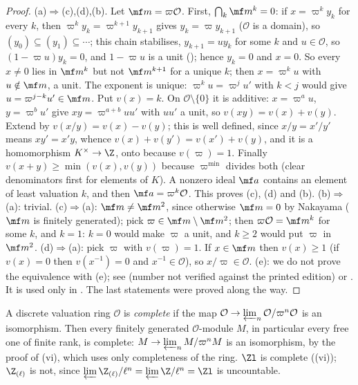 \begin{proof}
(a)$\Rightarrow$(c),(d),(b). Let $\mf m=\varpi\mathcal O$. First, $\bigcap_k\mf m^k=0$: if $x=\varpi^ky_k$ for every $k$, then $\varpi^ky_k=\varpi^{k+1}y_{k+1}$ gives
$y_k=\varpi y_{k+1}$ ($\mathcal O$ is a domain), so $(y_0)\subseteq(y_1)\subseteq\cdots$; this chain stabilises, $y_{k+1}=uy_k$ for some $k$ and $u\in\mathcal O$, so
$(1-\varpi u)y_k=0$, and $1-\varpi u$ is a unit (); hence $y_k=0$ and $x=0$. So every $x\ne0$ lies in $\mf m^k$ but not
$\mf m^{k+1}$ for a unique $k$; then $x=\varpi^ku$ with $u\notin\mf m$, a unit. The exponent is unique: $\varpi^ku=\varpi^ju'$ with $k<j$ would give
$u=\varpi^{j-k}u'\in\mf m$. Put $v(x)=k$. On $\mathcal O\setminus\{0\}$ it is additive: $x=\varpi^au$, $y=\varpi^bu'$ give $xy=\varpi^{a+b}uu'$ with $uu'$
a unit, so $v(xy)=v(x)+v(y)$. Extend by $v(x/y)=v(x)-v(y)$; this is well defined, since $x/y=x'/y'$ means $xy'=x'y$, whence
$v(x)+v(y')=v(x')+v(y)$, and it is a homomorphism $K^\times\to\Z$, onto because $v(\varpi)=1$. Finally
$v(x+y)\ge\min(v(x),v(y))$ because $\varpi^{\min}$ divides both (clear denominators first for elements of $K$). A nonzero ideal $\mf a$ contains an element of least valuation $k$, and then
$\mf a=\varpi^k\mathcal O$. This proves (c), (d) and (b).
(b)$\Rightarrow$(a): trivial. (c)$\Rightarrow$(a): $\mf m\ne\mf m^2$, since otherwise $\mf m=0$ by Nakayama ($\mf m$ is finitely generated); pick
$\varpi\in\mf m\setminus\mf m^2$; then $\varpi\mathcal O=\mf m^k$ for some $k$, and $k=1$: $k=0$ would make $\varpi$ a unit, and $k\ge2$ would put
$\varpi$ in $\mf m^2$. (d)$\Rightarrow$(a): pick $\varpi$ with $v(\varpi)=1$. If $x\in\mf m$ then $v(x)\ge1$ (if
$v(x)=0$ then $v(x^{-1})=0$ and $x^{-1}\in\mathcal O$), so $x/\varpi\in\mathcal O$.
(e): we do not prove the equivalence with (e); see \cite[Proposition 9.2]{AtiyahMacdonald} (number not verified against the printed
edition) or \cite[Chapter I, Section 2]{SerreLocalFields}. It is used only in .
The last statements were proved along the way.
\end{proof}

A discrete valuation ring $\mathcal O$ is \emph{complete} if the map $\mathcal O\to\varprojlim_n\mathcal O/\varpi^n\mathcal O$ is an isomorphism. Then every
finitely generated $\mathcal O$-module $M$, in particular every free one of finite rank, is complete: $M\to\varprojlim_nM/\varpi^nM$ is an
isomorphism, by the proof of (vi), which uses only completeness of the ring. $\Zl$ is complete ((vi));
$\Z_{(\ell)}$ is not, since $\varprojlim\Z_{(\ell)}/\ell^n=\varprojlim\Z/\ell^n=\Zl$ is uncountable.

